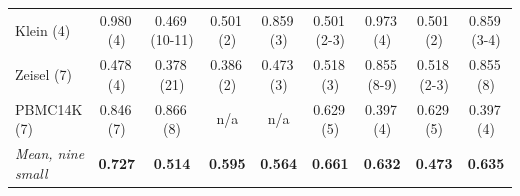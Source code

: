 \begin{table}[t]
\begin{tabular}{lcccccccc}
Klein (4) & 0.980\,(4) & 0.469\,(10\textrm{-}11) & 0.501\,(2) & 0.859\,(3) & 0.501\,(2\textrm{-}3) & 0.973\,(4) & 0.501\,(2) & 0.859\,(3\textrm{-}4) \\
Zeisel (7) & 0.478\,(4) & 0.378\,(21) & 0.386\,(2) & 0.473\,(3) & 0.518\,(3) & 0.855\,(8\textrm{-}9) & 0.518\,(2\textrm{-}3) & 0.855\,(8) \\
PBMC14K (7) & 0.846\,(7) & 0.866\,(8) & n/a & n/a & 0.629\,(5) & 0.397\,(4) & 0.629\,(5) & 0.397\,(4) \\
\midrule
\textit{Mean, nine small} & \textbf{0.727} & \textbf{0.514} & \textbf{0.595} & \textbf{0.564} & \textbf{0.661} & \textbf{0.632} & \textbf{0.473} & \textbf{0.635} \\
\bottomrule
\end{tabular}
\end{table}
